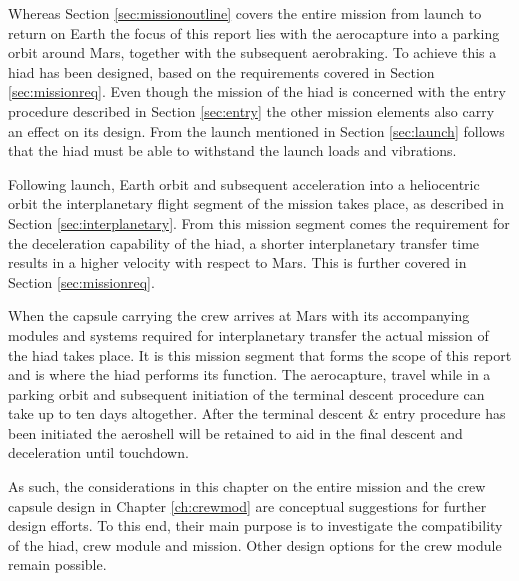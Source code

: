 Whereas Section \ref{sec:missionoutline} covers the entire mission from launch to return on Earth the focus of this report lies with the aerocapture into a parking orbit around Mars, together with the subsequent aerobraking. To achieve this a \gls{hiad} has been designed, based on the requirements covered in Section \ref{sec:missionreq}. Even though the mission of the \gls{hiad} is concerned with the entry procedure described in Section \ref{sec:entry} the other mission elements also carry an effect on its design. From the launch mentioned in Section \ref{sec:launch} follows that the \gls{hiad} must be able to withstand the launch loads and vibrations. 

Following launch, Earth orbit and subsequent acceleration into a heliocentric orbit the interplanetary flight segment of the mission takes place, as described in Section \ref{sec:interplanetary}. From this mission segment comes the requirement for the deceleration capability of the \gls{hiad}, a shorter interplanetary transfer time results in a higher velocity with respect to Mars. This is further covered in Section \ref{sec:missionreq}. 

When the capsule carrying the crew arrives at Mars with its accompanying modules and systems required for interplanetary transfer the actual mission of the \gls{hiad} takes place. It is this mission segment that forms the scope of this report and is where the \gls{hiad} performs its function. The aerocapture, travel while in a parking orbit and subsequent initiation of the terminal descent procedure can take up to ten days altogether. After the terminal descent \& entry procedure has been initiated the aeroshell will be retained to aid in the final descent and deceleration until touchdown.

As such, the considerations in this chapter on the entire mission and the crew capsule design in Chapter \ref{ch:crewmod} are conceptual suggestions for further design efforts. To this end, their main purpose is to investigate the compatibility of the \gls{hiad}, crew module and mission. Other design options for the crew module remain possible.